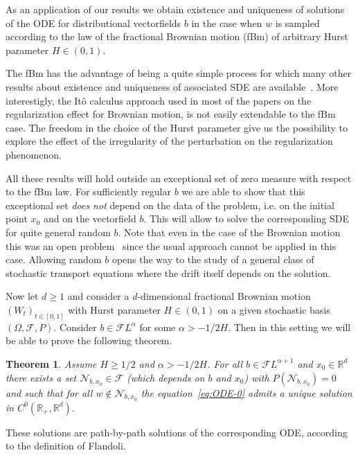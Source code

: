\documentclass[11pt,a4paper,draft,reqno]{amsart}
\newtheorem{theorem}{Theorem}
\theoremstyle{definition}
\newcommand{\RR}{\mathbb{R}}
\newcommand{\cF}{\mathcal{F}}
\begin{document}
\bigskip

As an application of our results we obtain existence and uniqueness of solutions of the ODE for distributional vectorfields $b$ in the case when $w$ is sampled according to the law of the fractional Brownian motion (fBm) of arbitrary Hurst parameter $H\in (0,1)$. 

The fBm has the advantage of being a quite simple process for which many other results
about existence and uniqueness of associated SDE are available~\cite{MR1934157}. More interestigly, the It\^o calculus approach used in most of the papers on the regularization effect for Brownian motion, is not easily extendable to the fBm case. The freedom in the choice of the Hurst parameter give us the possibility to explore the effect of the irregularity of the perturbation on the regularization phenomenon.

All these results will hold outside an exceptional set of zero measure with respect to the fBm law. For sufficiently regular $b$ we are able to show that this exceptional set \emph{does not} depend on the data of the problem, i.e. on the initial point $x_0$ and on the vectorfield $b$. This will allow to solve the corresponding SDE for quite general random $b$. Note that even in the case of the Brownian motion this was an open problem~\cite{FGP} since the usual approach cannot be applied in this case. Allowing random $b$ opens the way to the study of a general class of stochastic transport equations where the drift itself depends on the solution. 

\bigskip
Now let $d\ge 1$ and consider  a $d$-dimensional fractional Brownian motion $(W_t)_{t\in[0,1]}$  with Hurst parameter $H\in(0,1)$ on a given stochastic basis $(\Omega,\cF,P)$. Consider $b\in\cF L^\alpha$ for some $\alpha > -1/2H$. Then in this setting we will be able to prove the following theorem.

\begin{theorem}\label{eq:fbm-theorem-1}
Assume $H\ge1/2$ and $\alpha >-1/2H$. For all $b\in\cF L^{\alpha+1}$ and $x_0\in\RR^d$ there exists a set $\mathcal N_{b,x_0} \in \cF$ (which depends on $b$ and $x_0$) with $P(\mathcal {N}_{b,x_0})=0$ and such that  for all $w\not\in \mathcal N_{b,x_0}$ the equation~\eqref{eq:ODE-0} admits a unique solution in $C^0(\RR_+,\RR^d)$.
\end{theorem}

These solutions are path-by-path solutions of the corresponding ODE, according to the definition of Flandoli. 
\end{document}
